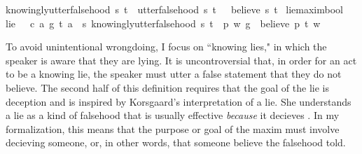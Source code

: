 \begin{isabellebody}
{\isachardoublequoteopen}knowingly{\isacharunderscore}utter{\isacharunderscore}falsehood\ s\ t\ {\isasymequiv}\ {\isacharparenleft}utter{\isacharunderscore}falsehood\ s\ t{\isacharparenright}\ \isactrlbold {\isasymand}\ {\isacharparenleft}\isactrlbold {\isasymnot}\ {\isacharparenleft}believe\ s\ t{\isacharparenright}{\isacharparenright}{\isachardoublequoteclose}\isanewline
%
\isanewline
\isanewline
{}\isamarkupfalse%
\ lie{\isacharcolon}{\isacharcolon}{\isachardoublequoteopen}maxim{\isasymRightarrow}bool{\isachardoublequoteclose}\ \ \isanewline
{\isachardoublequoteopen}lie\ {\isasymequiv}\ {\isasymlambda}\ {\isacharparenleft}c{\isacharcomma}\ a{\isacharcomma}\ g{\isacharparenright}{\isachardot}\ {\isasymexists}t{\isachardot}\ {\isacharparenleft}a\ \isactrlbold {\isasymlongrightarrow}\ {\isacharparenleft}{\isasymlambda}s{\isachardot}\ knowingly{\isacharunderscore}utter{\isacharunderscore}falsehood\ s\ t{\isacharparenright}{\isacharparenright}\ {\isasymand}\ {\isacharparenleft}{\isasymexists}p{\isachardot}\ {\isasymforall}w{\isachardot}\ {\isacharparenleft}g\ \isactrlbold {\isasymrightarrow}\ {\isacharparenleft}believe\ p\ t{\isacharparenright}{\isacharparenright}\ w{\isacharparenright}{\isachardoublequoteclose}\isanewline
%
%
\begin{isamarkuptext}%
To avoid unintentional wrongdoing, I focus on ``knowing lies," 
in which the speaker is aware that they are lying. It is uncontroversial that, in order for an act to be
a knowing lie, the speaker must utter a false statement that they do not believe. The second half of 
this definition requires that the goal of the lie is deception and is inspired by  Korsgaard's interpretation 
of a lie. She understands a lie as a kind of falsehood that is usually effective \emph{because} it decieves
\citep[4]{KorsgaardRTL}. In my formalization, this means that the purpose or goal of the maxim must
involve decieving someone, or, in other words, that someone believe the falsehood told.%
\end{isamarkuptext}\isamarkuptrue%

\end{isabellebody}
